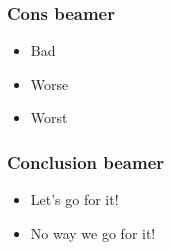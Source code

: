 \documentclass[
  11pt,
  ignorenonframetext,
]{article}
\providecommand{\tightlist}{%
  \setlength{\itemsep}{0pt}\setlength{\parskip}{0pt}}
\begin{document}
\subsubsection{Cons beamer}\label{cons-beamer}

\begin{itemize}
\tightlist
\item
  Bad
\item
  Worse
\item
  Worst
\end{itemize}

\subsubsection{Conclusion beamer}\label{conclusion-beamer}

\begin{itemize}
\tightlist
\item
  Let's go for it!
\item
  No way we go for it!
\end{itemize}
\end{document}
